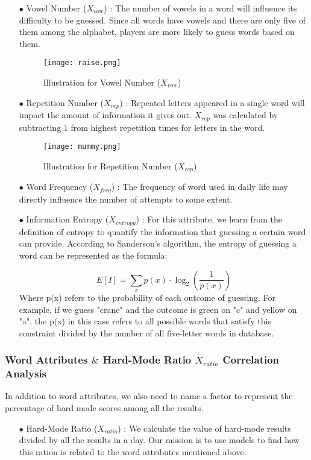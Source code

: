\begin{itemize}

    \item [$\bullet$] Vowel Number ($X_{vow}$) : The number of vowels in a word will influence its difficulty to be guessed. Since all words have vowels and there are only five of them among the alphabet, players are more likely to guess words based on them.
    
    \begin{figure}[h]
    \centering
    \texttt{[image: raise.png]}
    \caption{Illustration for Vowel Number ($X_{vow}$) }
    \label{norm dist}
    \end{figure}

    \item [$\bullet$] Repetition Number ($X_{rep}$) : Repeated letters appeared in a single word will impact the amount of information it gives out. $X_{rep}$ was calculated by subtracting 1 from highest repetition times for letters in the word.
   
    \begin{figure}[h]
    \centering
    \texttt{[image: mummy.png]}
    \caption{Illustration for Repetition Number ($X_{rep}$) }
    \label{norm dist}
    \end{figure}
    
    \item [$\bullet$] Word Frequency ($X_{freq}$) : The frequency of word used in daily life may directly influence the number of attempts to some extent.
    
    \item [$\bullet$] Information Entropy ($X_{entropy}$) : For this attribute, we learn from the definition of entropy to quantify the information that guessing a certain word can provide. According to Sanderson's algorithm\cite{article3}, the entropy of guessing a word can be represented as the formula:
    
    $$ E[I]=\sum_{x}p(x)\cdot \log_2(\frac{1}{p(x)}) $$
    Where p(x) refers to the probability of each outcome of guessing. For example, if we guess "crane" and the outcome is green on "c" and yellow on "a", the p(x) in this case refers to all possible words that satisfy this constraint divided by the number of all five-letter words in database.
\end{itemize}
\subsubsection{Word Attributes $\&$ Hard-Mode Ratio $X_{ratio}$ Correlation Analysis}
    \par In addition to word attributes, we also need to name a factor to represent the percentage of hard mode scores among all the results. 
    \begin{itemize}
        \item [$\bullet$]
    Hard-Mode Ratio ($X_{ratio}$) : We calculate the value of hard-mode results divided by all the results in a day. Our mission is to use models to find how this ration is related to the word attributes mentioned above.
\end{itemize}

